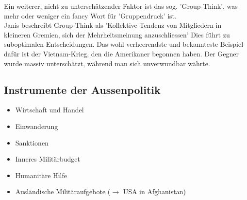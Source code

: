 \documentclass[a4paper, 11pt]{article}
\begin{document}
Ein weiterer, nicht zu unterschätzender Faktor ist das sog. 'Group-Think', was mehr oder weniger ein fancy Wort für 'Gruppendruck' ist. \\ 
Janis beschreibt Group-Think als 'Kollektive Tendenz von Mitgliedern in kleineren Gremien, sich der Mehrheitsmeinung anzuschliessen' Dies führt zu suboptimalen Entscheidungen. Das wohl verheerendste und bekannteste Beispiel dafür ist der Vietnam-Krieg, den die Amerikaner begonnen haben. Der Gegner wurde massiv unterschätzt, während man sich unverwundbar währte.

\subsection{Instrumente der Aussenpolitik}

\begin{multicols}{2}
	\begin{itemize}
		\item Wirtschaft und Handel
		\item Einwanderung
		\item Sanktionen
		\item Inneres Militärbudget
		\item Humanitäre Hilfe
		\item Ausländische Militäraufgebote ($\rightarrow$  USA in Afghanistan)
	\end{itemize}
\end{multicols}
\end{document}
